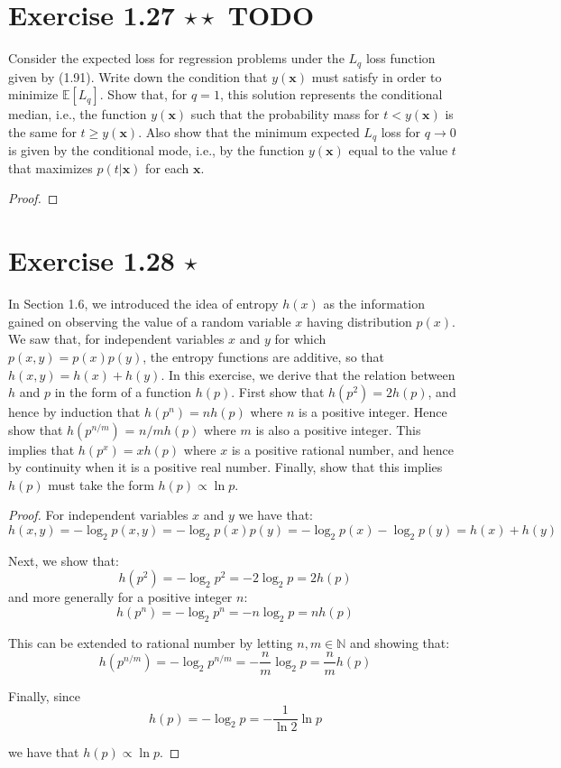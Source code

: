 \section*{Exercise 1.27 $\star \star$ TODO}
Consider the expected loss for regression problems under the $L_q$ loss
function given by (1.91). Write down the condition that $y(\mathbf{x})$ 
must satisfy in order to minimize $\mathbb{E}[L_q]$. Show that, for $q = 1$,
this solution represents the conditional median, i.e., the function 
$y(\mathbf{x})$ such that the probability mass for $t < y(\mathbf{x})$ 
is the same for $t \geq y(\mathbf{x})$. Also show that the minimum expected
$L_q$ loss for $q \to 0$ is given by the conditional mode, i.e., by
the function $y(\mathbf{x})$ equal to the value $t$ that maximizes 
$p(t | \mathbf{x})$ for each  $\mathbf{x}$.

\vspace{1em}

\begin{proof}
    
\end{proof}

\section*{Exercise 1.28 $\star$}
In Section 1.6, we introduced the idea of entropy $h(x)$ as the information
gained on observing the value of a random variable  $x$ having distribution
$p(x)$. We saw that, for independent variables $x$ and $y$ for which
$p(x, y) = p(x)p(y)$, the entropy functions are additive, so that 
$h(x, y) = h(x) + h(y)$. In this exercise, we derive that the relation
between $h$ and  $p$ in the form of a function  $h(p)$. First show that
$h(p^2) = 2h(p)$, and hence by induction that $h(p^n) = nh(p)$ where
$n$ is a positive integer. Hence show that $h(p^{n/m})$ = $n/m h(p)$
where $m$ is also a positive integer. This implies that $h(p^x) = xh(p)$ where
$x$ is a positive rational number, and hence by continuity when it is
a positive real number. Finally, show that this implies $h(p)$ must take
the form  $h(p) \propto \ln p$.

\vspace{1em}

\begin{proof}
    For independent variables $x$ and $y$ we have that:
    \[
        h(x, y) = -\log_2 p(x, y) = -\log_2 p(x) p(y) = -\log_2 p(x) -\log_2 p(y) = h(x) + h(y)
    \] 

    Next, we show that:
    \[
        h(p^2) = -\log_2 p^2 = -2 \log_2 p = 2h(p)
    \] 
    and more generally for a positive integer $n$:
    \[
        h(p^n) = -\log_2 p^n = -n \log_2 p = nh(p)
    \] 

    This can be extended to rational number by letting $n, m \in \mathbb{N}$ and
    showing that:
     \[
         h(p^{n/m}) = -\log_2 p^{n/m} = -\frac{n}{m} \log_2 p = \frac{n}{m} h(p)
    \] 

    Finally, since
    \[
        h(p) = -\log_2 p = -\frac{1}{\ln 2} \ln p
    \] 
    
    we have that $h(p) \propto \ln p$.
\end{proof}

